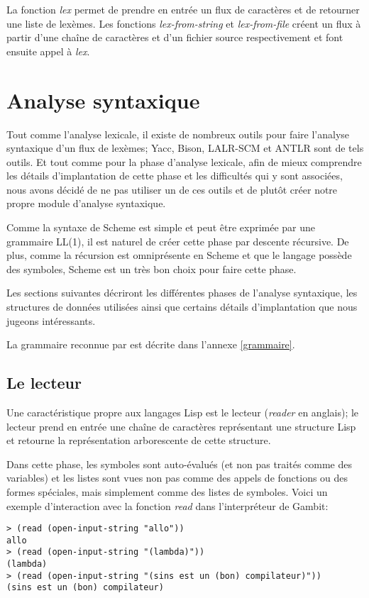 \documentclass[10pt]{report}
\begin{document}
La fonction \emph{lex} permet de prendre en entrée un flux de
caractères et de retourner une liste de lexèmes.  Les fonctions
\emph{lex-from-string} et \emph{lex-from-file} créent un flux à partir
d'une chaîne de caractères et d'un fichier source respectivement et
font ensuite appel à \emph{lex}.


\chapter{Analyse syntaxique}

Tout comme l'analyse lexicale, il existe de nombreux outils pour faire
l'analyse syntaxique d'un flux de lexèmes; Yacc, Bison, LALR-SCM et
ANTLR sont de tels outils.  Et tout comme pour la phase d'analyse
lexicale, afin de mieux comprendre les détails d'implantation de cette
phase et les difficultés qui y sont associées, nous avons décidé de ne
pas utiliser un de ces outils et de plutôt créer notre propre module
d'analyse syntaxique.

Comme la syntaxe de Scheme est simple et peut être exprimée par une
grammaire LL(1), il est naturel de créer cette phase par descente
récursive.  De plus, comme la récursion est omniprésente en Scheme et
que le langage possède des symboles, Scheme est un très bon choix pour
faire cette phase.

Les sections suivantes décriront les différentes phases de l'analyse
syntaxique, les structures de données utilisées ainsi que certains
détails d'implantation que nous jugeons intéressants.

La grammaire reconnue par \sins{} est décrite dans l'annexe
\ref{grammaire}.


\section{Le lecteur}

Une caractéristique propre aux langages Lisp est le lecteur
(\emph{reader} en anglais); le lecteur prend en entrée une chaîne de
caractères représentant une structure Lisp et retourne la
représentation arborescente de cette structure.

Dans cette phase, les symboles sont auto-évalués (et non pas traités
comme des variables) et les listes sont vues non pas comme des appels
de fonctions ou des formes spéciales, mais simplement comme des listes
de symboles.  Voici un exemple d'interaction avec la fonction
\emph{read} dans l'interpréteur de Gambit:

\begin{verbatim}
> (read (open-input-string "allo"))
allo
> (read (open-input-string "(lambda)"))
(lambda)
> (read (open-input-string "(sins est un (bon) compilateur)"))
(sins est un (bon) compilateur)
\end{verbatim}
\end{document}
